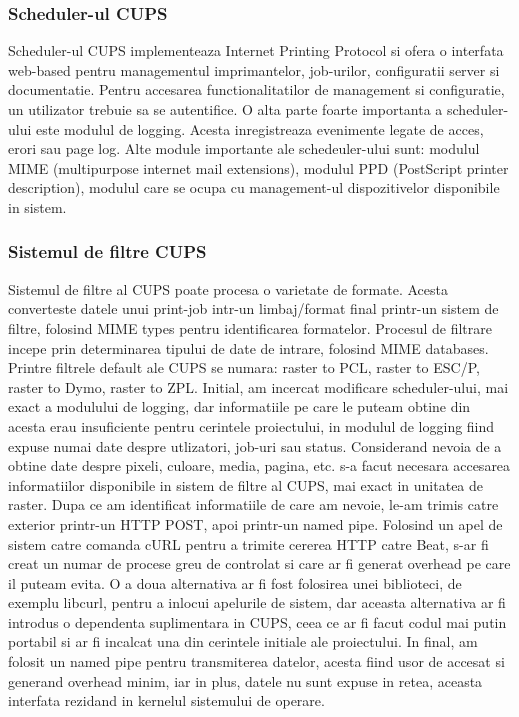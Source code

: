 \documentclass[12pt]{report}
\begin{document}
			\subsubsection{Scheduler-ul CUPS}
Scheduler-ul CUPS implementeaza Internet Printing Protocol si ofera o interfata web-based pentru managementul imprimantelor, job-urilor, configuratii server si documentatie. Pentru accesarea functionalitatilor de management si configuratie, un utilizator trebuie sa se autentifice. 
O alta parte foarte importanta a scheduler-ului este modulul de logging. Acesta inregistreaza evenimente legate de acces, erori sau page log.
Alte module importante ale schedeuler-ului sunt: modulul MIME (multipurpose internet mail extensions), modulul PPD (PostScript printer description), modulul care se ocupa cu management-ul dispozitivelor disponibile in sistem.


			\subsubsection{Sistemul de filtre CUPS}
Sistemul de filtre al CUPS poate procesa o varietate de formate. Acesta converteste datele unui print-job intr-un limbaj/format final printr-un sistem de filtre, folosind MIME types pentru identificarea formatelor.
Procesul de filtrare incepe prin determinarea tipului de date de intrare, folosind MIME databases. Printre filtrele default ale CUPS se numara: raster to PCL, raster to ESC/P, raster to Dymo, raster to ZPL.
Initial, am incercat modificare scheduler-ului, mai exact a modulului de logging, dar informatiile pe care le puteam obtine din acesta erau insuficiente pentru cerintele proiectului, in modulul de logging fiind expuse numai date despre utlizatori, job-uri sau status. Considerand nevoia de a obtine date despre pixeli, culoare, media, pagina, etc. s-a facut necesara accesarea informatiilor disponibile in sistem de filtre al CUPS, mai exact in unitatea de raster. Dupa ce am identificat informatiile de care am nevoie, le-am trimis catre exterior printr-un HTTP POST, apoi printr-un named pipe. Folosind un apel de sistem catre comanda cURL pentru a trimite cererea HTTP catre Beat, s-ar fi creat un numar de procese greu de controlat si care ar fi generat overhead pe care il puteam evita. O a doua alternativa ar fi fost folosirea unei biblioteci, de exemplu libcurl, pentru a inlocui apelurile de sistem, dar aceasta alternativa ar fi introdus o dependenta suplimentara in CUPS, ceea ce ar fi facut codul mai putin portabil si ar fi incalcat una din cerintele initiale ale proiectului. In final, am folosit un named pipe pentru transmiterea datelor, acesta fiind usor de accesat si generand overhead minim, iar in plus, datele nu sunt expuse in retea, aceasta interfata rezidand in kernelul sistemului de operare.
\end{document}
